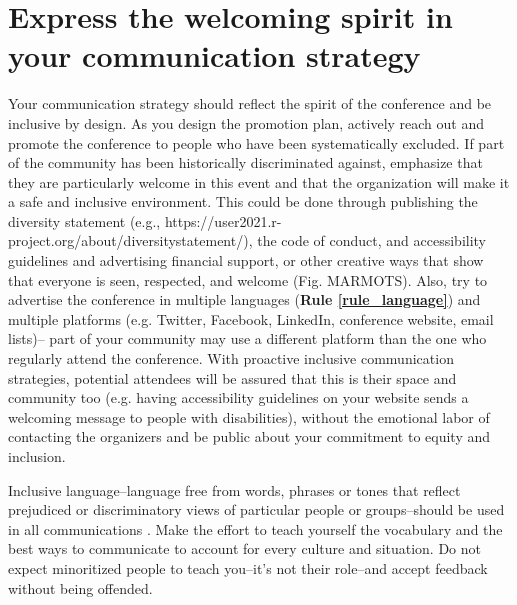 \documentclass[10pt,letterpaper]{article}
\begin{document}


\section{Express the welcoming spirit in your communication strategy}
\label{rule_communication}

Your communication strategy should reflect the spirit of the conference and be inclusive by design. 
As you design the promotion plan, actively reach out and promote the conference to people who have been systematically excluded. 
If part of the community has been historically discriminated against, emphasize that they are particularly welcome in this event and that the organization will make it a safe and inclusive environment. This could be done through publishing the diversity statement (e.g., https://user2021.r-project.org/about/diversitystatement/), the code of conduct, and accessibility guidelines and advertising financial support, or other creative ways that show that everyone is seen, respected, and welcome (Fig. MARMOTS).
Also, try to advertise the conference in multiple languages (\textbf{Rule \ref{rule_language}}) and multiple platforms (e.g. Twitter, Facebook, LinkedIn, conference website, email lists)--
part of your community may use a different platform than the one who regularly attend the conference. 
With proactive inclusive communication strategies, potential attendees will be assured that this is their space and community too (e.g. having accessibility guidelines on your website sends a welcoming message to people with disabilities), without the emotional labor of contacting the organizers and be public about your commitment to equity and inclusion.

Inclusive language--language free from words, phrases or tones that reflect prejudiced or discriminatory views of particular people or groups--should be used in all communications \cite{hallDesigningDiversityInclusion2019}.
Make the effort to teach yourself the vocabulary and the best ways to communicate to account for every culture and situation. 
Do not expect minoritized people to teach you--it's not their role--and accept feedback without being offended.
\end{document}
